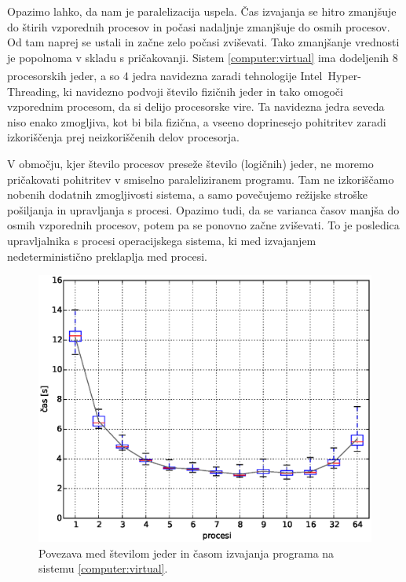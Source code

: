 \documentclass[a4paper,12pt]{book}
\begin{document}
Opazimo lahko, da nam je paralelizacija uspela. Čas izvajanja se hitro zmanjšuje do štirih vzporednih procesov in počasi nadaljnje zmanjšuje do osmih procesov. Od tam naprej se ustali in začne zelo počasi zviševati. Tako zmanjšanje vrednosti je popolnoma v skladu s pričakovanji. Sistem \ref{computer:virtual} ima dodeljenih 8 procesorskih jeder, a so 4 jedra navidezna zaradi tehnologije Intel\textsuperscript\textregistered\ Hyper-Threading, ki navidezno podvoji število fizičnih jeder in tako omogoči vzporednim procesom, da si delijo procesorske vire. Ta navidezna jedra seveda niso enako zmogljiva, kot bi bila fizična, a vseeno doprinesejo pohitritev zaradi izkoriščenja prej neizkoriščenih delov procesorja. 

V območju, kjer število procesov preseže število (logičnih) jeder, ne moremo pričakovati pohitritev v smiselno paraleliziranem programu. Tam ne izkoriščamo nobenih dodatnih zmogljivosti sistema, a samo povečujemo režijske stroške pošiljanja in upravljanja s procesi. Opazimo tudi, da se varianca časov manjša do osmih vzporednih procesov, potem pa se ponovno začne zviševati. To je posledica upravljalnika s procesi operacijskega sistema, ki med izvajanjem nedeterministično preklaplja med procesi. 

\begin{figure}
	\centering
	\includegraphics[scale=0.55]{res/processes-times.eps}
	\caption{Povezava med številom jeder in časom izvajanja programa na sistemu \ref{computer:virtual}. }
	\label{pic:processes-times}
\end{figure}
\end{document}
